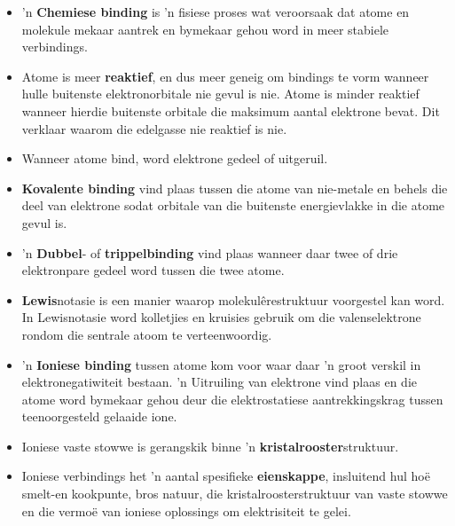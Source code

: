 
            \nopagebreak
\begin{itemize}[noitemsep]
\item 'n \textbf{Chemiese binding} is 'n fisiese proses wat veroorsaak dat atome en molekule mekaar aantrek en bymekaar gehou word in meer stabiele verbindings.
\item Atome is meer \textbf{reaktief}, en dus meer geneig om bindings te vorm wanneer hulle buitenste elektronorbitale nie gevul is nie. Atome is minder reaktief wanneer hierdie buitenste orbitale die maksimum aantal elektrone bevat. Dit verklaar waarom die edelgasse nie reaktief is nie.
\item Wanneer atome bind, word elektrone gedeel of uitgeruil.
\item \textbf{Kovalente binding} vind plaas tussen die atome van nie-metale en behels die deel van elektrone sodat orbitale van die buitenste energievlakke in die atome gevul is.
\item 'n \textbf{Dubbel}- of \textbf{trippelbinding} vind plaas wanneer daar twee of drie elektronpare gedeel word tussen die twee atome.
\item \textbf{Lewis}notasie is een manier waarop molekulêrestruktuur voorgestel kan word. In Lewisnotasie word kolletjies en kruisies gebruik om die valenselektrone rondom die sentrale atoom te verteenwoordig.
\item 'n \textbf{Ioniese binding} tussen atome kom voor waar daar 'n groot verskil in elektronegatiwiteit bestaan. 'n Uitruiling van elektrone vind plaas en die atome word bymekaar gehou deur die elektrostatiese  aantrekkingskrag tussen teenoorgesteld gelaaide ione.
\item Ioniese vaste stowwe is gerangskik binne 'n \textbf{kristalrooster}struktuur.
\item Ioniese verbindings het 'n aantal spesifieke \textbf{eienskappe}, insluitend hul hoë smelt-en kookpunte, bros natuur, die kristalroosterstruktuur van vaste stowwe en die vermo\"{e} van ioniese oplossings om elektrisiteit te gelei.

\end{itemize}
